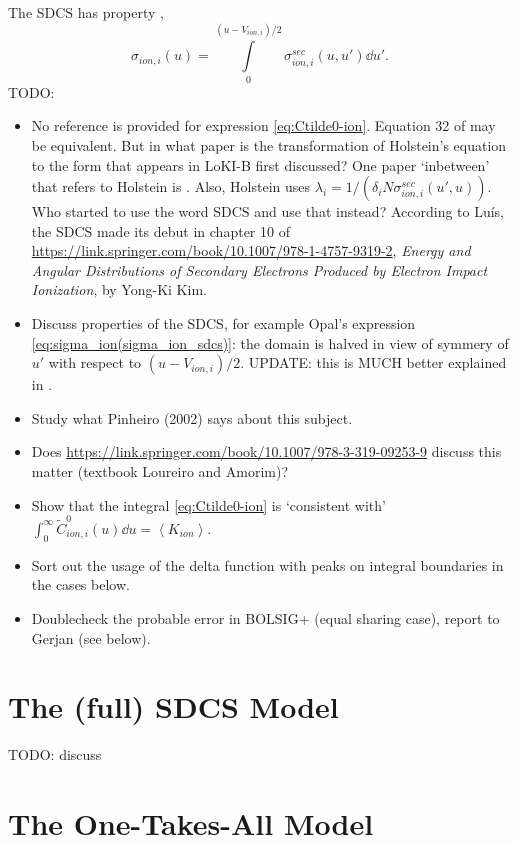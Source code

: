 \documentclass{book}
\newcommand{\MEAN}[1]{\ensuremath{\!\left\langle{{#1}}\right\rangle}}
\begin{document}
The SDCS has property \cite[eq. 1]{Opal1971}, \cite[eq. 14]{Manual_2_2_0}
\begin{equation}
	\sigma_{ion,i}(u) = \int\limits_0^{(u-V_{ion,i})/2}\sigma_{ion,i}^{sec}(u,u')\dd{u'}.
	\label{eq:sigma_ion(sigma_ion_sdcs)}
\end{equation}
TODO:
\begin{itemize}
	\item No reference is provided for expression \eqref{eq:Ctilde0-ion}.
		Equation 32 of \cite{Holstein1946} may be equivalent. But in what
		paper is the transformation of Holstein's equation to the form that
		appears in LoKI-B first discussed? One paper `inbetween' that
		refers to Holstein is \cite{Yoshida1983}. Also, Holstein uses
		$\lambda_i=1/(\delta_iN\sigma_{ion,i}^{sec}(u',u))$. Who started to use the
		word SDCS and use that instead?
		According to Lu\'is, the SDCS made its debut in chapter 10 of
		\url{https://link.springer.com/book/10.1007/978-1-4757-9319-2},
		{\em Energy and Angular Distributions of Secondary Electrons Produced
		by Electron Impact Ionization}, by Yong-Ki Kim.
	\item Discuss properties of the SDCS, for example Opal's expression
		\eqref{eq:sigma_ion(sigma_ion_sdcs)}: the domain
		is halved in view of symmery of $u'$ with respect to $(u-V_{ion,i})/2$.
		UPDATE: this is MUCH better explained in \cite[below eq. 31a]{Holstein1946}.
	\item Study what Pinheiro (2002) \cite{Pinheiro2002} says about this subject.
	\item Does \url{https://link.springer.com/book/10.1007/978-3-319-09253-9} discuss this
		matter (textbook Loureiro and Amorim)?
	\item Show that the integral \eqref{eq:Ctilde0-ion} is `consistent with'
		$\int_0^\infty \tilde{C}^0_{ion,i}(u)\dd{u}=\MEAN{K_{ion}}$.
	\item Sort out the usage of the delta function with peaks on integral boundaries
		in the cases below.
	\item Doublecheck the probable error in BOLSIG+ (equal sharing case), report
		to Gerjan (see below).
\end{itemize}

\section{The (full) SDCS Model}

TODO: discuss

\section{The One-Takes-All Model}
\end{document}
